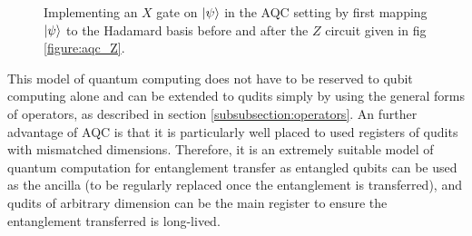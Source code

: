 \begin{figure}[h]
    \begin{center}
    \caption{Implementing an $X$ gate on $\ket{\psi}$ in the AQC setting by first mapping $\ket{\psi}$ to the Hadamard basis before and after the $Z$ circuit given in fig \ref{figure:aqc_Z}.}
    \label{figure:aqc_X}
    \end{center}
\end{figure}
This model of quantum computing does not have to be reserved to qubit computing alone and can be extended to qudits simply by using the general forms of operators, as described in section \ref{subsubsection:operators}.
An further advantage of AQC is that it is particularly well placed to used registers of qudits with mismatched dimensions.
Therefore, it is an extremely suitable model of quantum computation for entanglement transfer as entangled qubits can be used as the ancilla (to be regularly replaced once the entanglement is transferred), and qudits of arbitrary dimension can be the main register to ensure the entanglement transferred is long-lived.
